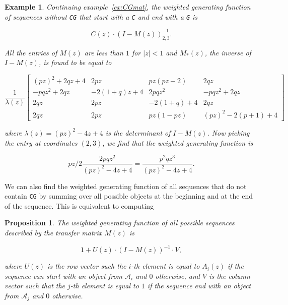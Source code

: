 \documentclass{article}
\newtheorem{example}{Example}
\newtheorem{proposition}{Proposition}
\begin{document}
\begin{example}
\label{ex:CGmat2}
Continuing example~\ref{ex:CGmat}, the weighted generating function of
sequences without \texttt{CG} that start with a \texttt{C} and end with a
\texttt{G} is

\begin{equation*}
C(z) \cdot (I-M(z))^{-1}_{2,3}.
\end{equation*}

All the entries of $M(z)$ are less than $1$ for $|z| < 1$ and $M_*(z)$,
the inverse of $I-M(z)$, is found to be equal to 

\begin{equation*}
\frac{1}{\lambda(z)} \left[
\begin{matrix}
(pz)^2+2qz+4   & 2pz        & pz(pz-2)   & 2qz                \\
-pqz^2+2qz     & -2(1+q)z+4 & 2pqz^2     & -pqz^2+2qz         \\
2qz            & 2pz        & -2(1+q)+4  & 2qz                \\
2qz            & 2pz        & pz(1-pz)   & (pz)^2 - 2(p+1) +4
\end{matrix}
\right]
\end{equation*}

\noindent
where $\lambda(z) = (pz)^2 - 4z + 4$ is the determinant of $I-M(z)$. Now
picking the entry at coordinates $(2,3)$, we find that the weighted
generating function is

\begin{equation*}
pz/2\frac{2pqz^2}{(pz)^2 - 4z + 4}
= \frac{p^2qz^3}{(pz)^2 - 4z + 4}.
\end{equation*}
\end{example}

We can also find the weighted generating function of all sequences that do
not contain \texttt{CG} by summing over all possible objects at the
beginning and at the end of the sequence. This is equivalent to computing

\begin{proposition}
\label{th:TM2WGF}
The weighted generating function of all possible sequences described by
the transfer matrix $M(z)$ is 

\begin{equation}
1 + U(z) \cdot (I-M(z))^{-1} \cdot V,
\end{equation}

\noindent
where $U(z)$ is the row vector such the $i$-th element is equal to
$A_i(z)$ if the sequence can start with an object from $\mathcal{A}_i$ and
$0$ otherwise, and $V$ is the column vector such that the $j$-th element
is equal to $1$ if the sequence end with an object from $\mathcal{A}_j$
and $0$ otherwise.
\end{proposition}
\end{document}
